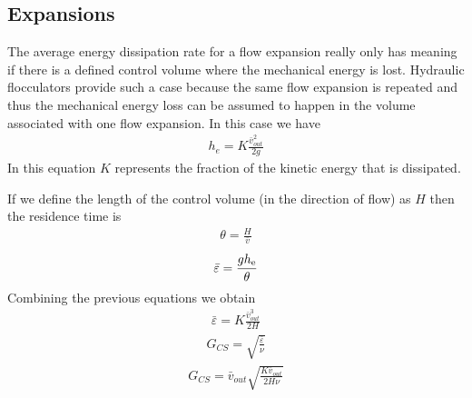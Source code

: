 \documentclass[letterpaper,10pt,english]{sphinxmanual}
\begin{document}
\subsection{Expansions}
\label{\detokenize{Rapid_Mix/RM_Derivations:expansions}}\label{\detokenize{Rapid_Mix/RM_Derivations:heading-expansions}}
The average energy dissipation rate for a flow expansion really only has meaning if there is a defined control volume where the mechanical energy is lost. Hydraulic flocculators provide such a case because the same flow expansion is repeated and thus the mechanical energy loss can be assumed to happen in the volume associated with one flow expansion. In this case we have
\begin{equation}\label{equation:Rapid_Mix/RM_Derivations:Rapid_Mix/RM_Derivations:97}
\begin{split}h_e =  K\frac{\bar v_{out}^2}{2g}\end{split}
\end{equation}
In this equation \(K\) represents the fraction of the kinetic energy that is dissipated.

If we define the length of the control volume (in the direction of flow) as \(H\) then the residence time is
\begin{equation}\label{equation:Rapid_Mix/RM_Derivations:Rapid_Mix/RM_Derivations:98}
\begin{split}\theta = \frac{H}{\bar v}\end{split}
\end{equation}\begin{equation}\label{equation:Rapid_Mix/RM_Derivations:Rapid_Mix/RM_Derivations:99}
\begin{split}\bar\varepsilon = \frac{gh_{\rm{e}}}{\theta}\end{split}
\end{equation}
Combining the previous equations we obtain
\begin{equation}\label{equation:Rapid_Mix/RM_Derivations:Rapid_Mix/RM_Derivations:100}
\begin{split}\bar\varepsilon = K\frac{\bar v_{out}^3}{2H}\end{split}
\end{equation}\begin{equation}\label{equation:Rapid_Mix/RM_Derivations:Rapid_Mix/RM_Derivations:101}
\begin{split}G_{CS} = \sqrt{\frac{\bar \varepsilon}{\nu}}\end{split}
\end{equation}\begin{equation}\label{equation:Rapid_Mix/RM_Derivations:Rapid_Mix/RM_Derivations:102}
\begin{split}G_{CS} = \bar v_{out}\sqrt{\frac{K\bar v_{out}}{2H\nu}}\end{split}
\end{equation}
\end{document}
